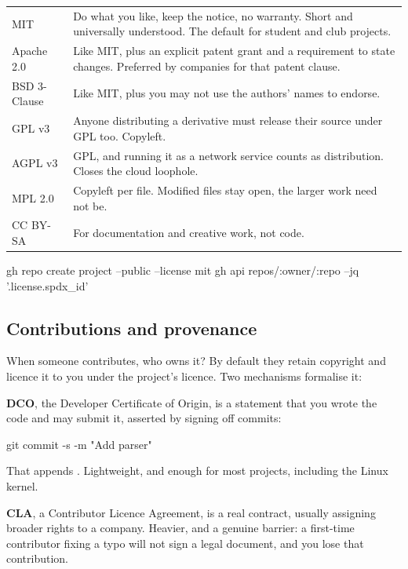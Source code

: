 \documentclass[11pt]{article}
\begin{document}
\vspace{0.5em}
\begin{tabularx}{\linewidth}{@{}L{2.5cm} X@{}}
\toprule
{} &  \\
\midrule
MIT & Do what you like, keep the notice, no warranty. Short and universally
understood. The default for student and club projects. \\
Apache 2.0 & Like MIT, plus an explicit patent grant and a requirement to state
changes. Preferred by companies for that patent clause. \\
BSD 3-Clause & Like MIT, plus you may not use the authors' names to endorse. \\
GPL v3 & Anyone distributing a derivative must release their source under GPL too.
Copyleft. \\
AGPL v3 & GPL, and running it as a network service counts as distribution. Closes
the cloud loophole. \\
MPL 2.0 & Copyleft per file. Modified files stay open, the larger work need not be. \\
CC BY-SA & For documentation and creative work, not code. \\
\bottomrule
\end{tabularx}
\vspace{0.5em}

\begin{shell}
gh repo create project --public --license mit
gh api repos/:owner/:repo --jq '.license.spdx_id'
\end{shell}

\subsection{Contributions and provenance}

When someone contributes, who owns it? By default they retain copyright and licence
it to you under the project's licence. Two mechanisms formalise it:

\textbf{DCO}, the Developer Certificate of Origin, is a statement that you wrote the
code and may submit it, asserted by signing off commits:

\begin{shell}
git commit -s -m "Add parser"
\end{shell}

That appends . Lightweight, and enough for most
projects, including the Linux kernel.

\textbf{CLA}, a Contributor Licence Agreement, is a real contract, usually assigning
broader rights to a company. Heavier, and a genuine barrier: a first-time contributor
fixing a typo will not sign a legal document, and you lose that contribution.
\end{document}
